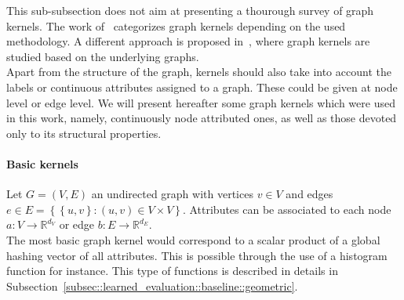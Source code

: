             This sub-subsection does not aim at presenting a thourough survey of graph kernels.
            The work of~\textcite{ghosh2018journey} categorizes graph kernels depending on the used methodology.
            A different approach is proposed in~\textcite{kriege2019survey}, where graph kernels are studied based on the underlying graphs.\\

            Apart from the structure of the graph, kernels should also take into account the labels or continuous attributes assigned to a graph.
            These could be given at node level or edge level.
            We will present hereafter some graph kernels which were used in this work, namely, continuously node attributed ones, as well as those devoted only to its structural properties.\\

            \paragraph{Basic kernels}
                Let $G = \left(V, E\right)$ an undirected graph with vertices $v\in V$ and edges $e \in E =\left\{\left\{u, v\right\}: (u, v) \in V\times V\right\}$.
                Attributes can be associated to each node $a: V \rightarrow \mathbb{R}^{d_V}$ or edge $b: E \rightarrow \mathbb{R}^{d_E}$.\\

                The most basic graph kernel would correspond to a scalar product of a global hashing vector of all attributes.
                This is possible through the use of a histogram function for instance.
                This type of functions is described in details in Subsection~\ref{subsec::learned_evaluation::baseline::geometric}.\\

